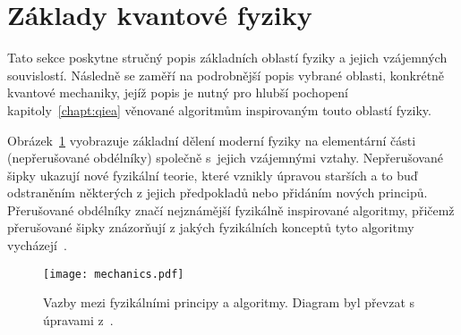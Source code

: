 \section{Základy kvantové fyziky}
Tato sekce poskytne stručný popis základních oblastí fyziky a jejich vzájemných souvislostí. 
Následně se zaměří na podrobnější popis vybrané oblasti, konkrétně kvantové mechaniky, jejíž popis je nutný pro hlubší pochopení kapitoly~\ref{chapt:qiea} věnované algoritmům inspirovaným touto oblastí fyziky.

Obrázek~\ref{fig:mechanics} vyobrazuje základní dělení moderní fyziky na elementární části (nepřerušované obdélníky) společně s~jejich vzájemnými vztahy. 
Nepřerušované šipky ukazují nové fyzikální teorie, které vznikly úpravou starších a to buď odstraněním některých z jejich předpokladů nebo přidáním nových principů.
Přerušované obdélníky značí nejznámější fyzikálně inspirované algoritmy, přičemž přerušované šipky znázorňují z jakých fyzikálních konceptů tyto algoritmy vycházejí~\cite{NaturalComputing}.

\begin{figure}[ht!]
    \centering
    \texttt{[image: mechanics.pdf]}
    \caption{Vazby mezi fyzikálními principy a algoritmy. Diagram byl převzat s úpravami z~\cite{NaturalComputing}.}
    \label{fig:mechanics}
\end{figure}

